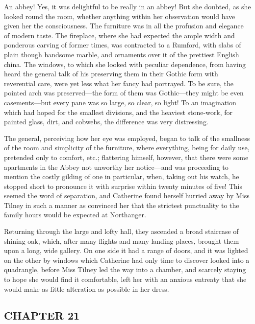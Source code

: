 An abbey! Yes, it was delightful to be really in an abbey! But she doubted, as she looked round the room, whether anything within her observation would have given her the consciousness. The furniture was in all the profusion and elegance of modern taste. The fireplace, where she had expected the ample width and ponderous carving of former times, was contracted to a Rumford, with slabs of plain though handsome marble, and ornaments over it of the prettiest English china. The windows, to which she looked with peculiar dependence, from having heard the general talk of his preserving them in their Gothic form with reverential care, were yet less what her fancy had portrayed. To be sure, the pointed arch was preserved---the form of them was Gothic---they might be even casements---but every pane was so large, so clear, so light! To an imagination which had hoped for the smallest divisions, and the heaviest stone-work, for painted glass, dirt, and cobwebs, the difference was very distressing.

The general, perceiving how her eye was employed, began to talk of the smallness of the room and simplicity of the furniture, where everything, being for daily use, pretended only to comfort, etc.; flattering himself, however, that there were some apartments in the Abbey not unworthy her notice---and was proceeding to mention the costly gilding of one in particular, when, taking out his watch, he stopped short to pronounce it with surprise within twenty minutes of five! This seemed the word of separation, and Catherine found herself hurried away by Miss Tilney in such a manner as convinced her that the strictest punctuality to the family hours would be expected at Northanger.

Returning through the large and lofty hall, they ascended a broad staircase of shining oak, which, after many flights and many landing-places, brought them upon a long, wide gallery. On one side it had a range of doors, and it was lighted on the other by windows which Catherine had only time to discover looked into a quadrangle, before Miss Tilney led the way into a chamber, and scarcely staying to hope she would find it comfortable, left her with an anxious entreaty that she would make as little alteration as possible in her dress.

\subsection[chapter-21]{\useURL[url23][][][]\from[url23]CHAPTER 21}


